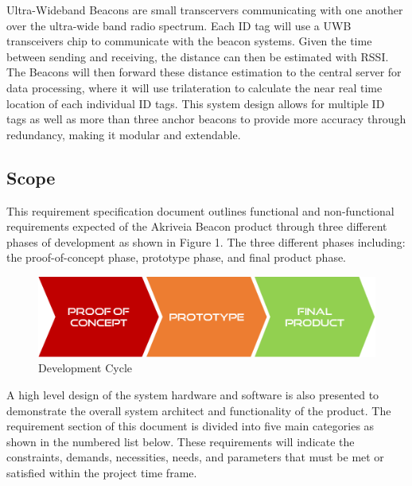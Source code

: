 \bigskip
Ultra-Wideband Beacons are small transcervers communicating with one another over the ultra-wide band radio spectrum. Each ID tag will use a UWB transceivers chip to communicate with the beacon systems. Given the time between sending and receiving, the distance can then be estimated with RSSI. The Beacons will then forward these distance estimation to the central server for data processing, where it will use trilateration to calculate the near real time location of each individual ID tags. This system design allows for multiple ID tags as well as more than three anchor beacons to provide more accuracy through redundancy, making it modular and extendable.

\break

\subsection{Scope}
This requirement specification document outlines functional and non-functional requirements expected of the Akriveia Beacon product through three different phases of development as shown in Figure 1. The three different phases including: the proof-of-concept phase, prototype phase, and final product phase.
\medskip

\begin{figure}[H]
\centering
    \includegraphics[scale=0.4]{./images/dev-path.png}
    \caption{Development Cycle}
\end{figure}

A high level design of the system hardware and software is also presented to demonstrate the overall system architect and functionality of the product. The requirement section of this document is divided into five main categories as shown in the numbered list below. These requirements will indicate the constraints, demands, necessities, needs, and parameters that must be met or satisfied within the project time frame.

